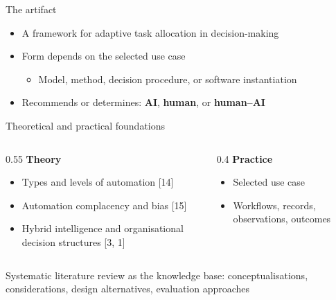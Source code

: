 \documentclass[aspectratio=169,11pt]{beamer}
\begin{document}
\begin{frame}{The artifact}
  \begin{itemize}
    \item A framework for adaptive task allocation in decision-making
    \item Form depends on the selected use case
    \begin{itemize}
      \item Model, method, decision procedure, or software instantiation
    \end{itemize}
    \item Recommends or determines: \textbf{AI}, \textbf{human}, or \textbf{human--AI}
  \end{itemize}
\end{frame}

\begin{frame}{Theoretical and practical foundations}
  \begin{columns}[T]
    \begin{column}{0.55\textwidth}
      \textbf{Theory}
      \begin{itemize}
        \item Types and levels of automation [14]
        \item Automation complacency and bias [15]
        \item Hybrid intelligence and organisational decision structures [3, 1]
      \end{itemize}
    \end{column}
    \begin{column}{0.4\textwidth}
      \textbf{Practice}
      \begin{itemize}
        \item Selected use case
        \item Workflows, records, observations, outcomes
      \end{itemize}
    \end{column}
  \end{columns}
  \vspace{0.8em}
  Systematic literature review as the knowledge base:
  conceptualisations, considerations, design alternatives, evaluation approaches
\end{frame}
\end{document}
